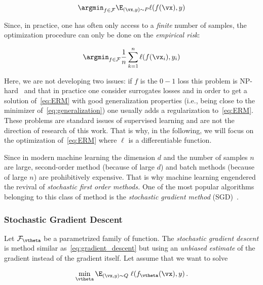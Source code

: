 \begin{equation}\label{eq:generalization}
\argmin_{f \in \mathcal F} \E_{(\vx,y)\sim P} \ell(f(\vx),y)
\end{equation}

Since, in practice, one has often only access to a \emph{finite} number of samples, the optimization procedure can only be done on the \emph{empirical risk}:

\begin{equation}\label{eq:ERM}
\argmin_{f \in \mathcal F} \frac{1}{n} \sum_{k=1}^n \ell(f(\vx_i),y_i)
\end{equation}

Here, we are not developing two issues: if $f$ is the $0-1$ loss this problem is NP-hard~\citep{feldman2012agnostic,ben2003difficulty} and that in practice one consider surrogates losses and in order to get a solution of~\eqref{eq:ERM} with good generalization properties (i.e., being close to the minimizer of~\eqref{eq:generalization}) one usually adds a regularization to~\eqref{eq:ERM}. These problems are standard issues of supervised learning and are not the direction of research of this work. That is why, in the following, we will focus on the optimization of~\eqref{eq:ERM} where $\ell$ is a differentiable function.

Since in modern machine learning the dimension $d$ and the number of samples $n$ are large, second-order method (because of large $d$) and batch methods (because of large $n$) are prohibitively expensive. That is why machine learning engendered the revival of \emph{stochastic first order methods.} One of the most popular algorithms belonging to this class of method is the \emph{stochastic gradient method} (SGD)~\citep{robbins1951stochastic}.







\subsubsection{Stochastic Gradient Descent}




Let $\mathcal F_\vtheta$ be a parametrized family of function. The \emph{stochastic gradient descent} is method similar as~\eqref{eq:gradient_descent} but using an \emph{unbiased estimate} of the gradient instead of the gradient itself. Let assume that we want to solve

\begin{equation}
\min_{\vtheta} \E_{(\vx,y)\sim Q} \; \ell(f_\vtheta(\vx),y) \, .
\end{equation}

